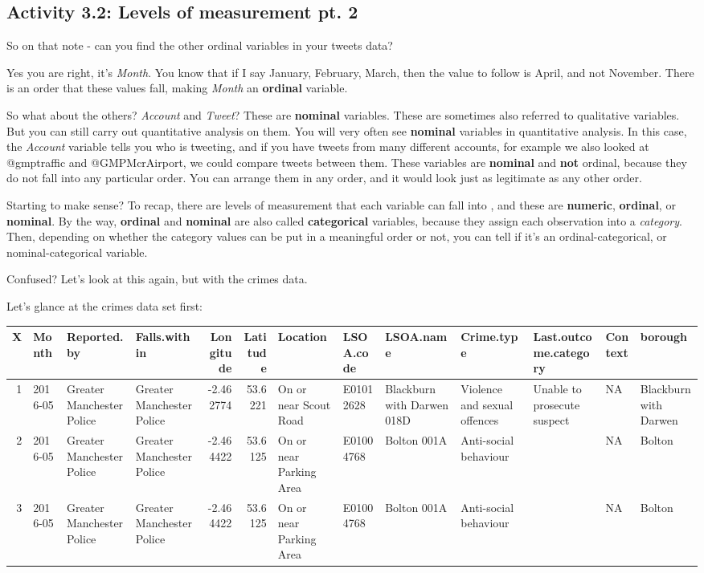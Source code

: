 \documentclass[]{book}
\theoremstyle{definition}
\theoremstyle{definition}
\theoremstyle{definition}
\theoremstyle{remark}
\begin{document}
\hypertarget{activity-3.2-levels-of-measurement-pt.-2}{%
\subsection{Activity 3.2: Levels of measurement pt.
2}\label{activity-3.2-levels-of-measurement-pt.-2}}

{ So on that note - can you find the other ordinal variables in your
tweets data? }

Yes you are right, it's \emph{Month}. You know that if I say January,
February, March, then the value to follow is April, and not November.
There is an order that these values fall, making \emph{Month} an
\textbf{ordinal} variable.

So what about the others? \emph{Account} and \emph{Tweet}? These are
\textbf{nominal} variables. These are sometimes also referred to
qualitative variables. But you can still carry out quantitative analysis
on them. You will very often see \textbf{nominal} variables in
quantitative analysis. In this case, the \emph{Account} variable tells
you who is tweeting, and if you have tweets from many different
accounts, for example we also looked at @gmptraffic and @GMPMcrAirport,
we could compare tweets between them. These variables are
\textbf{nominal} and \textbf{not} ordinal, because they do not fall into
any particular order. You can arrange them in any order, and it would
look just as legitimate as any other order.

Starting to make sense? To recap, there are levels of measurement that
each variable can fall into , and these are \textbf{numeric},
\textbf{ordinal}, or \textbf{nominal}. By the way, \textbf{ordinal} and
\textbf{nominal} are also called \textbf{categorical} variables, because
they assign each observation into a \emph{category}. Then, depending on
whether the category values can be put in a meaningful order or not, you
can tell if it's an ordinal-categorical, or nominal-categorical
variable.

Confused? Let's look at this again, but with the crimes data.

Let's glance at the crimes data set first:

\begin{tabular}{r|l|l|l|r|r|l|l|l|l|l|l|l}
\hline
X & Month & Reported.by & Falls.within & Longitude & Latitude & Location & LSOA.code & LSOA.name & Crime.type & Last.outcome.category & Context & borough\\
\hline
1 & 2016-05 & Greater Manchester Police & Greater Manchester Police & -2.462774 & 53.6221 & On or near Scout Road & E01012628 & Blackburn with Darwen 018D & Violence and sexual offences & Unable to prosecute suspect & NA & Blackburn with Darwen\\
\hline
2 & 2016-05 & Greater Manchester Police & Greater Manchester Police & -2.464422 & 53.6125 & On or near Parking Area & E01004768 & Bolton 001A & Anti-social behaviour &  & NA & Bolton\\
\hline
3 & 2016-05 & Greater Manchester Police & Greater Manchester Police & -2.464422 & 53.6125 & On or near Parking Area & E01004768 & Bolton 001A & Anti-social behaviour &  & NA & Bolton\\
\hline
\end{tabular}
\end{document}
